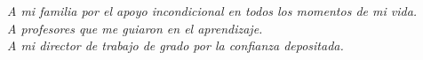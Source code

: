 \documentclass[../Main.tex]{subfiles}
\begin{document}
\vspace*{4cm}
{
\raggedleft
\begin{flushright}
\textit{A mi familia por el apoyo incondicional en todos los momentos de mi vida. \\
A profesores que me guiaron en el aprendizaje.\\
A mi director de trabajo de grado por la confianza depositada.}
\end{flushright}
}
\end{document}
